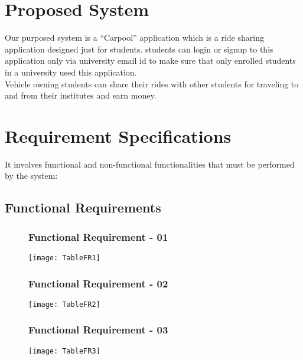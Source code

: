\section{Proposed System}
Our purposed system is a “Carpool” application which is a ride sharing application designed just for students. students can login or signup to this application only via university email id to make sure that only enrolled students in a university used this application.
\\ Vehicle owning students can share their rides with other students for traveling to and from their institutes and earn money.

\section{Requirement Specifications}
It involves functional and non-functional functionalities that must be performed by the system:

\subsection{Functional Requirements}

\begin{figure}[ht]
\subsubsection{Functional Requirement - 01}
\centering
\texttt{[image: TableFR1]}
\end{figure}

\begin{figure}[ht]
\subsubsection{Functional Requirement - 02}
\centering
\texttt{[image: TableFR2]}
\end{figure}

\begin{figure}[ht]
\subsubsection{Functional Requirement - 03}
\centering
\texttt{[image: TableFR3]}
\end{figure}

